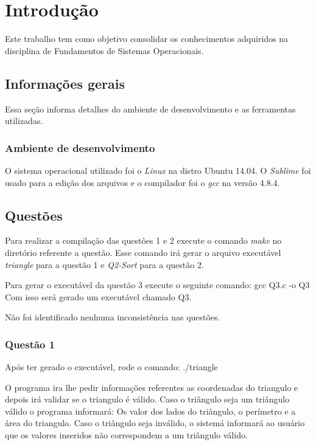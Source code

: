 \chapter[Introdução]{Introdução}

	Este trabalho tem como objetivo consolidar os conhecimentos adquiridos na disciplina de Fundamentos de Sistemas Operacionais.

\section{Informações gerais}

	Essa seção informa detalhes do ambiente de desenvolvimento e as ferramentas utilizadas.

\subsection{Ambiente de desenvolvimento}

	O sistema operacional utilizado foi o \textit{Linux} na distro Ubuntu 14.04. O \textit{Sublime} foi usado para a edição dos arquivos e o compilador foi o \textit{gcc} na versão  4.8.4.

\section{Questões}

	Para realizar a compilação das questões 1 e 2 execute o comando \textit{make} no diretório referente a questão. Esse comando irá gerar o arquivo executável \textit{triangle} para a questão 1 e \textit{Q2-Sort} para a questão 2.

	Para gerar o executável da questão 3 execute o seguinte comando: gcc Q3.c -o Q3
	Com isso será gerado um executável chamado Q3.

	Não foi identificado nenhuma inconsistência nas questões.

\subsection{Questão 1}

	Após ter gerado o executável, rode o comando: ./triangle

	O programa ira lhe pedir informações referentes as coordenadas do triangulo e depois irá validar se o triangulo é válido. Caso o triângulo seja um triângulo válido o programa informará: Os valor dos lados do triângulo, o perímetro e a área do triangulo. Caso o triângulo seja inválido, o sistemá informará ao usuário que os valores inseridos não correspondem a um triângulo válido.

